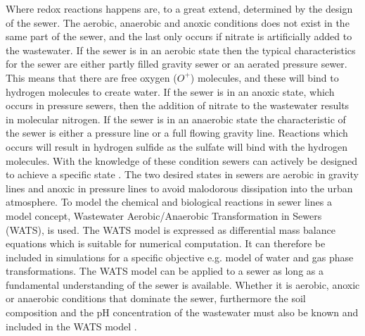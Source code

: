 Where redox reactions happens are, to a great extend, determined by the design of the sewer. The aerobic, anaerobic and anoxic conditions does not exist in the same part of the sewer, and the last only occurs if nitrate is artificially added to the wastewater. If the sewer is in an aerobic state then the typical characteristics for the sewer are either partly filled gravity sewer or an aerated pressure sewer. This means that there are free oxygen ($O^+$) molecules, and these will bind to hydrogen molecules to create water. If the sewer is in an anoxic state, which occurs in pressure sewers, then the addition of nitrate to the wastewater results in molecular nitrogen. If the sewer is in an anaerobic state the characteristic of the sewer is either a pressure line or a full flowing gravity line. Reactions which occurs will result in hydrogen sulfide as the sulfate will bind with the hydrogen molecules. With the knowledge of these condition sewers can actively be designed to achieve a specific state \cite{Sewer_processes}. The two desired states in sewers are aerobic in gravity lines and anoxic in pressure lines to avoid malodorous dissipation into the urban atmosphere.
To model the chemical and biological reactions in sewer lines a model concept, Wastewater Aerobic/Anaerobic Transformation in Sewers (WATS), is used. The WATS model is expressed as differential mass balance equations which is suitable for numerical computation. It can therefore be included in simulations for a specific objective e.g. model of water and gas phase transformations. The WATS model can be applied to a sewer as long as a fundamental understanding of the sewer is available. Whether it is aerobic, anoxic or anaerobic conditions that dominate the sewer, furthermore the soil composition and the pH concentration of the wastewater must also be known and included in the WATS model \cite{Sewer_processes}.     




